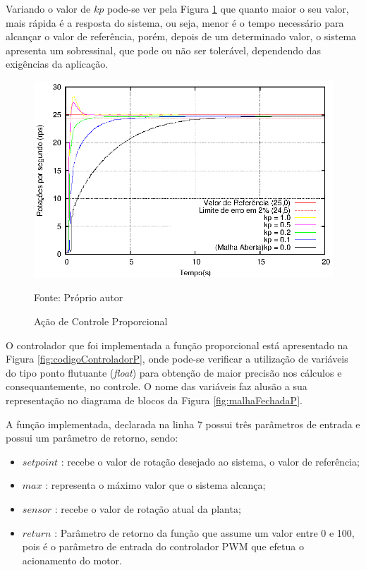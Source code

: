 Variando o valor de $kp$ pode-se ver pela Figura \ref{fig:acaoP} que quanto maior o seu valor, mais rápida é a resposta do sistema, ou seja, menor é o tempo necessário para alcançar o valor de referência, porém, depois de um determinado valor, o sistema apresenta um sobressinal, que pode ou não ser tolerável, dependendo das exigências da aplicação.

\begin{figure}[!htb]
\centering
\caption{Ação de Controle Proporcional}
\center\includegraphics[scale=1.4]{./imagens/acaoP.eps}
\label{fig:acaoP}

{\small Fonte: Próprio autor}
\end{figure}

O controlador que foi implementada a função proporcional está apresentado na Figura \ref{fig:codigoControladorP}, onde pode-se verificar a utilização de variáveis do tipo ponto flutuante (\emph{float}) para obtenção de maior precisão nos cálculos e consequantemente, no controle. O nome das variáveis faz alusão a sua representação no diagrama de blocos da Figura \ref{fig:malhaFechadaP}.

A função implementada, declarada na linha 7 possui três parâmetros de entrada e possui um parâmetro de retorno, sendo:
\begin{itemize}
  \item $setpoint$ : recebe o valor de rotação desejado ao sistema, o valor de referência;
  \item $max$ : representa o máximo valor que o sistema alcança;
  \item $sensor$ : recebe o valor de rotação atual da planta;
  \item $return $ : Parâmetro de retorno da função que assume um valor entre 0 e 100, pois é o parâmetro de entrada do controlador PWM que efetua o acionamento do motor.

\end{itemize}



